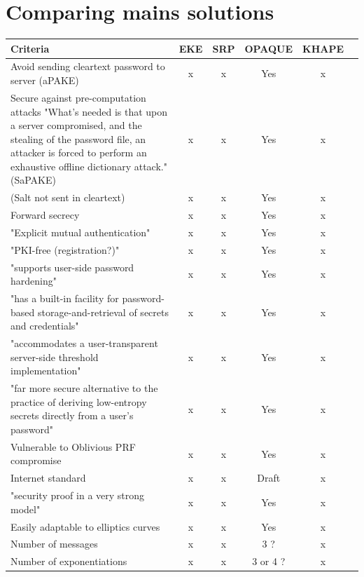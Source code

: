 \documentclass[../report.tex]{subfiles}
\begin{document}
\section{Comparing mains solutions}

\begin{center}
   \begin{tabular}{ | p{8cm} || c | c | c | c | c | }
     \hline
     \textbf{Criteria} & \textbf{EKE} & \textbf{SRP} & \textbf{OPAQUE} & \textbf{KHAPE} \\ \hline
     
     
     
     Avoid sending cleartext password to server (aPAKE) & x & x & Yes & x \\ \hline
     
     Secure against pre-computation attacks {"What's needed is that upon a server compromised, and the stealing of the password file, an attacker is forced to perform an exhaustive offline dictionary attack."} (SaPAKE) & x & x & Yes & x \\ \hline
     
     (Salt not sent in cleartext) & x & x & Yes & x \\ \hline
     Forward secrecy & x & x & Yes & x \\ \hline
     "Explicit mutual authentication" & x & x & Yes & x \\ \hline
     "PKI-free (registration?)" & x & x & Yes & x \\ \hline
     "supports user-side password hardening" & x & x & Yes & x \\ \hline
     "has a built-in facility for password-based storage-and-retrieval of secrets and credentials" & x & x & Yes & x \\ \hline
     "accommodates a user-transparent server-side threshold implementation" & x & x & Yes & x \\ \hline
     "far more secure alternative to the practice of deriving low-entropy secrets directly from a user's password" & x & x & Yes & x \\ \hline
     
     Vulnerable to Oblivious PRF compromise & x & x & Yes & x \\ \hline
     Internet standard & x & x & Draft & x \\ \hline
     
     "security proof in a very strong model" & x & x & Yes & x \\ \hline
     
     
     Easily adaptable to elliptics curves & x & x & Yes & x \\ \hline
     Number of messages & x & x & 3 ? & x \\ \hline
     Number of exponentiations & x & x & 3 or 4 ? & x \\ \hline

     \end{tabular}
 \end{center}
\end{document}

